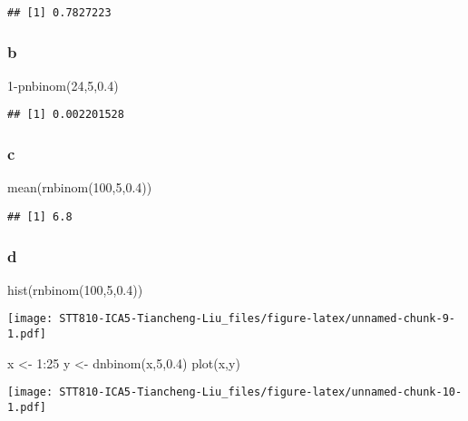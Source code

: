 \documentclass[
]{article}
\newenvironment{Shaded}{\begin{snugshade}}{\end{snugshade}}
\newcommand{\DecValTok}[1]{\textcolor[rgb]{0.00,0.00,0.81}{#1}}
\newcommand{\FloatTok}[1]{\textcolor[rgb]{0.00,0.00,0.81}{#1}}
\newcommand{\FunctionTok}[1]{\textcolor[rgb]{0.00,0.00,0.00}{#1}}
\newcommand{\NormalTok}[1]{#1}
\newcommand{\OtherTok}[1]{\textcolor[rgb]{0.56,0.35,0.01}{#1}}
\newcommand{\SpecialCharTok}[1]{\textcolor[rgb]{0.00,0.00,0.00}{#1}}
\begin{document}
\begin{verbatim}
## [1] 0.7827223
\end{verbatim}

\hypertarget{b-1}{%
\subsubsection{b}\label{b-1}}

\begin{Shaded}
\begin{Highlighting}[]
\DecValTok{1}\SpecialCharTok{{-}}\FunctionTok{pnbinom}\NormalTok{(}\DecValTok{24}\NormalTok{,}\DecValTok{5}\NormalTok{,}\FloatTok{0.4}\NormalTok{)}
\end{Highlighting}
\end{Shaded}

\begin{verbatim}
## [1] 0.002201528
\end{verbatim}

\hypertarget{c-1}{%
\subsubsection{c}\label{c-1}}

\begin{Shaded}
\begin{Highlighting}[]
\FunctionTok{mean}\NormalTok{(}\FunctionTok{rnbinom}\NormalTok{(}\DecValTok{100}\NormalTok{,}\DecValTok{5}\NormalTok{,}\FloatTok{0.4}\NormalTok{))}
\end{Highlighting}
\end{Shaded}

\begin{verbatim}
## [1] 6.8
\end{verbatim}

\hypertarget{d-1}{%
\subsubsection{d}\label{d-1}}

\begin{Shaded}
\begin{Highlighting}[]
\FunctionTok{hist}\NormalTok{(}\FunctionTok{rnbinom}\NormalTok{(}\DecValTok{100}\NormalTok{,}\DecValTok{5}\NormalTok{,}\FloatTok{0.4}\NormalTok{))}
\end{Highlighting}
\end{Shaded}

\texttt{[image: STT810-ICA5-Tiancheng-Liu\_files/figure-latex/unnamed-chunk-9-1.pdf]}

\begin{Shaded}
\begin{Highlighting}[]
\NormalTok{x }\OtherTok{\textless{}{-}} \DecValTok{1}\SpecialCharTok{:}\DecValTok{25}
\NormalTok{y }\OtherTok{\textless{}{-}} \FunctionTok{dnbinom}\NormalTok{(x,}\DecValTok{5}\NormalTok{,}\FloatTok{0.4}\NormalTok{)}
\FunctionTok{plot}\NormalTok{(x,y)}
\end{Highlighting}
\end{Shaded}

\texttt{[image: STT810-ICA5-Tiancheng-Liu\_files/figure-latex/unnamed-chunk-10-1.pdf]}
\end{document}
